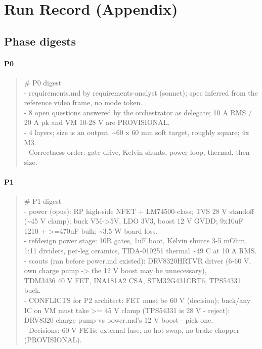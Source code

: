 \documentclass[11pt,a4paper]{article}
\begin{document}
\section{Run Record (Appendix)}
\subsection*{Phase digests}
\paragraph*{P0}
\begin{quote}\small\ttfamily\raggedright
\# P0 digest\\
- requirements.md by requirements-analyst (sonnet); spec inferred from the reference video frame, no mode token.\\
- 8 open questions answered by the orchestrator as delegate; 10 A RMS / 20 A pk and VM 10-28 V are PROVISIONAL.\\
- 4 layers; size is an output, \textasciitilde{}60 x 60 mm soft target, roughly square; 4x M3.\\
- Correctness order: gate drive, Kelvin shunts, power loop, thermal, then size.
\end{quote}
\paragraph*{P1}
\begin{quote}\small\ttfamily\raggedright
\# P1 digest\\
- power (opus): RP high-side NFET + LM74500-class; TVS 28 V standoff (\textasciitilde{}45 V clamp); buck VM-\textgreater{}5V, LDO 3V3, boost 12 V GVDD; 9x10uF 1210 + \textgreater{}=470uF bulk; \textasciitilde{}3.5 W board loss.\\
- refdesign power stage: 10R gates, 1uF boot, Kelvin shunts 3-5 mOhm, 1:11 dividers, per-leg ceramics, TIDA-010251 thermal \textasciitilde{}49 C at 10 A RMS.\\
- scouts (ran before power.md existed): DRV8320HRTVR driver (6-60 V, own charge pump -\textgreater{} the 12 V boost may be unnecessary),\\
  TDM3436 40 V FET, INA181A2 CSA, STM32G431CBT6, TPS54331 buck.\\
- CONFLICTS for P2 architect: FET must be 60 V (decision); buck/any IC on VM must take \textgreater{}= 45 V clamp (TPS54331 is 28 V - reject);\\
  DRV8320 charge pump vs power.md's 12 V boost - pick one.\\
- Decisions: 60 V FETs; external fuse, no hot-swap, no brake chopper (PROVISIONAL).
\end{quote}
\end{document}
